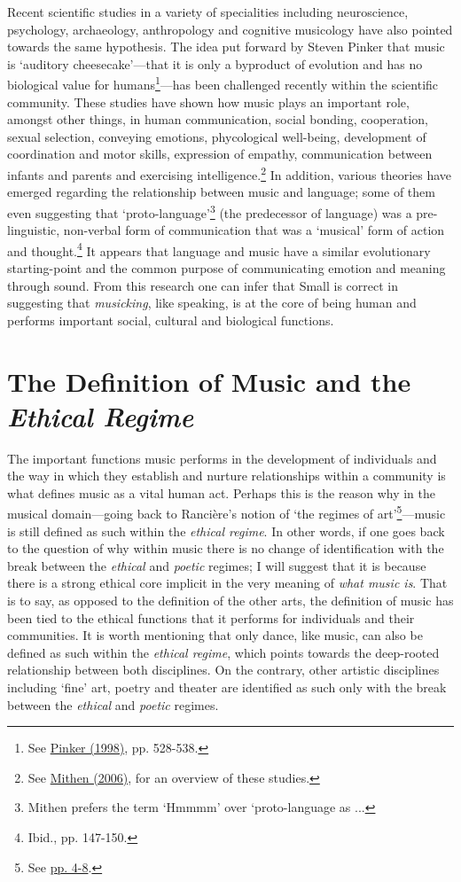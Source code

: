 Recent scientific studies in a variety of specialities including neuroscience, psychology, archaeology, anthropology and cognitive musicology have also pointed towards the same hypothesis. The idea put forward by Steven Pinker that music is `auditory cheesecake'---that it is only a byproduct of evolution and has no biological value for humans\footnote{See \hyperlink{pinker}{Pinker (1998)}, pp. 528-538.}---has been challenged recently within the scientific community.  These studies have shown how music plays an important role, amongst other things, in human communication, social bonding, cooperation, sexual selection, conveying emotions, phycological \mbox{well-being}, development of coordination and motor skills, expression of empathy, communication between infants and parents and exercising intelligence.\footnote{See \hyperlink{mithen}{Mithen (2006)}, for an overview of these studies.} In addition, various theories have emerged regarding the relationship between music and language; some of them even suggesting that \mbox{`proto-language'}\footnote{Mithen prefers the term `Hmmmm' over `proto-language as ...} (the predecessor of language) was a pre-linguistic, non-verbal form of communication that was a `musical' form of action and thought.\footnote{Ibid., pp. 147-150.} It appears that language and music have a similar evolutionary \mbox{starting-point} and the common purpose of communicating emotion and meaning through sound. From this research one can infer that Small is correct in suggesting that \emph{musicking}, like speaking, is at the core of being human and performs important social, cultural and biological functions. 

\hypertarget{musdef}{}
\section{The Definition of Music and the \emph{Ethical Regime}}

The important functions music performs in the development of individuals and the way in which they establish and nurture relationships within a community is what defines music as a vital human act. Perhaps this is the reason why in the musical domain---going back to Ranci\`{e}re's notion of `the regimes of art'\footnote{See \hyperlink{artregimes}{pp. 4-8}.}---music is still defined as such within the \emph{ethical regime}. In other words, if one goes back to the question of why within music there is no change of identification with the break between the \emph{ethical} and \emph{poetic} regimes; I will suggest that it is because there is a strong ethical core implicit in the very meaning of \emph{what music is}. That is to say, as opposed to the definition of the other arts, the definition of music has been tied to the ethical functions that it performs for individuals and their communities. It is worth mentioning that only dance, like music, can also be defined as such within the \emph{ethical regime}, which points towards the deep-rooted relationship between both disciplines. On the contrary, other artistic disciplines including `fine' art, poetry and theater are identified as such only with the break between the \emph{ethical} and \emph{poetic} regimes.   

